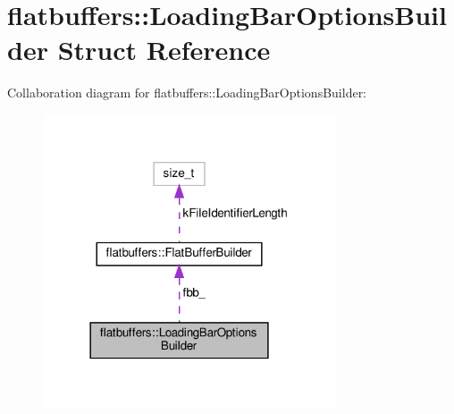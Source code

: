 \hypertarget{structflatbuffers_1_1LoadingBarOptionsBuilder}{}\section{flatbuffers\+:\+:Loading\+Bar\+Options\+Builder Struct Reference}
\label{structflatbuffers_1_1LoadingBarOptionsBuilder}


Collaboration diagram for flatbuffers\+:\+:Loading\+Bar\+Options\+Builder\+:
\nopagebreak
\begin{figure}[H]
\begin{center}
\leavevmode
\includegraphics[width=246pt]{structflatbuffers_1_1LoadingBarOptionsBuilder__coll__graph}
\end{center}
\end{figure}
